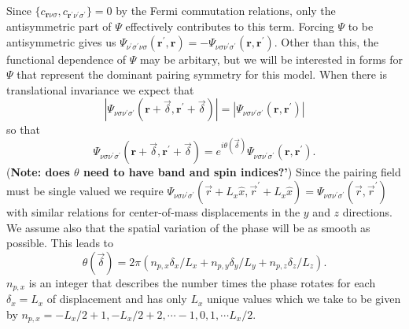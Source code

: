 Since 
$\{c_{\mathbf{r}\nu\sigma},c_{\mathbf{r}^{\prime}\nu^{\prime}\sigma^{\prime}}\}=0$ by the Fermi
commutation relations, only the antisymmetric part of
$\Psi$ effectively contributes to this term.
Forcing $\Psi$ to be antisymmetric gives us
$\Psi_{\nu^{\prime}\sigma^{\prime}\nu\sigma}(\mathbf{r}^{\prime},\mathbf{r}) =
- \Psi_{\nu\sigma\nu^{\prime}\sigma^{\prime}}(\mathbf{r},\mathbf{r}^{\prime})$.
Other than this,
the functional dependence of $\Psi$ may be arbitary, but we
will be interested in forms for $\Psi$ that represent
the dominant pairing symmetry for this model.  When there is
translational invariance we expect that
\begin{equation}
 | \Psi_{\nu\sigma\nu^{\prime}\sigma^{\prime}}(\mathbf{r}+\vec{\delta},
\mathbf{r}^{\prime}+\vec{\delta}) | =
|\Psi_{\nu\sigma\nu^{\prime}\sigma^{\prime}}(\mathbf{r},\mathbf{r}^{\prime})|
\end{equation}
so that
\begin{equation}
\Psi_{\nu\sigma\nu^{\prime}\sigma^{\prime}}(\mathbf{r}+\vec{\delta},
\mathbf{r}^{\prime}+\vec{\delta}) = 
e^{i\theta(\vec{\delta})} 
\Psi_{\nu\sigma\nu^{\prime}\sigma^{\prime}}(\mathbf{r},\mathbf{r}^{\prime}).
\end{equation}
(\textbf{Note: does $\theta$ need to have band and spin indices?'})
Since the pairing field must be single valued we require 
$\Psi_{\nu\sigma\nu^{\prime}\sigma^{\prime}}(\vec{r} + L_x\hat{x}, \vec{r}^{\prime} + L_x \hat{x}) = 
\Psi_{\nu\sigma\nu^{\prime}\sigma^{\prime}}(\vec{r}, \vec{r}^{\prime})$
with similar relations for center-of-mass displacements in the 
$y$ and $z$ directions.
We assume also that the spatial variation of the phase will
be as smooth as possible.  This leads to
\begin{equation}
\theta(\vec{\delta}) = 2 \pi (n_{p,x} \delta_x / L_x + n_{p,y} 
\delta_y / L_y
+ n_{p,z} \delta_z / L_z).
\end{equation}
$n_{p,x}$ is an integer that describes the number times
the phase rotates for each $\delta_x = L_x$ of displacement
and has only $L_x$ unique values which we take to be
given by $n_{p,x} = -L_x/2 + 1, -L_x/2 + 2, \cdots -1, 0, 1, \cdots L_x/2$.

